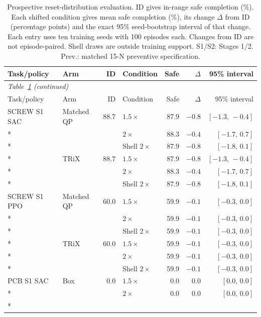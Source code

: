 \begingroup\small
\setlength{\tabcolsep}{3pt}
\renewcommand{\arraystretch}{1.2}
\begin{longtable}{@{}llrlrrr@{}}
\caption{Prospective reset-distribution evaluation. ID gives in-range safe completion (\%). Each shifted condition gives mean safe completion (\%), its change $\Delta$ from ID (percentage points) and the exact 95\% seed-bootstrap interval of that change. Each entry uses ten training seeds with 100 episodes each. Changes from ID are not episode-paired. Shell draws are outside training support. S1/S2: Stages 1/2. Prev.: matched 15-N preventive specification.}\label{tab:ood-safe}\\
\toprule Task/policy & Arm & ID & Condition & Safe & $\Delta$ & 95\% interval\\\midrule\endfirsthead
\multicolumn{7}{l}{\small\itshape Table~\ref{tab:ood-safe} (continued)}\\
\toprule Task/policy & Arm & ID & Condition & Safe & $\Delta$ & 95\% interval\\\midrule\endhead
SCREW S1 SAC & Matched QP & 88.7 & $1.5\times$ & 87.9 & $-0.8$ & $[-1.3,\,-0.4]$\\*
 &  &  & $2\times$ & 88.3 & $-0.4$ & $[-1.7,\,0.7]$\\*
 &  &  & Shell $2\times$ & 87.9 & $-0.8$ & $[-1.8,\,0.1]$\\*
\addlinespace[2pt]
 & TRiX & 88.7 & $1.5\times$ & 87.9 & $-0.8$ & $[-1.3,\,-0.4]$\\*
 &  &  & $2\times$ & 88.3 & $-0.4$ & $[-1.7,\,0.7]$\\*
 &  &  & Shell $2\times$ & 87.9 & $-0.8$ & $[-1.8,\,0.1]$\\
\midrule
SCREW S1 PPO & Matched QP & 60.0 & $1.5\times$ & 59.9 & $-0.1$ & $[-0.3,\,0.0]$\\*
 &  &  & $2\times$ & 59.9 & $-0.1$ & $[-0.3,\,0.0]$\\*
 &  &  & Shell $2\times$ & 59.9 & $-0.1$ & $[-0.3,\,0.0]$\\*
\addlinespace[2pt]
 & TRiX & 60.0 & $1.5\times$ & 59.9 & $-0.1$ & $[-0.3,\,0.0]$\\*
 &  &  & $2\times$ & 59.9 & $-0.1$ & $[-0.3,\,0.0]$\\*
 &  &  & Shell $2\times$ & 59.9 & $-0.1$ & $[-0.3,\,0.0]$\\
\midrule
PCB S1 SAC & Box & 0.0 & $1.5\times$ & 0.0 & $0.0$ & $[0.0,\,0.0]$\\*
 &  &  & $2\times$ & 0.0 & $0.0$ & $[0.0,\,0.0]$\\*

\end{longtable}
